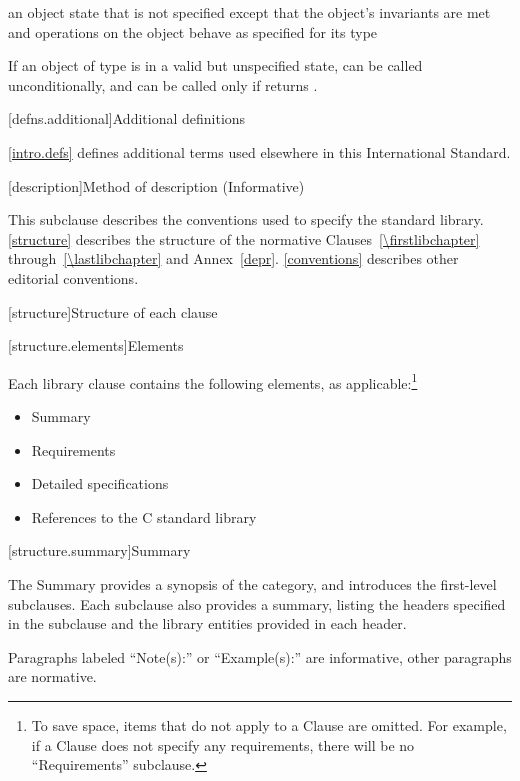 %
an object state that is not specified except that the object's invariants are
met and operations on the object behave as specified for its type\\
\begin{example} If an object  of type  is in a
valid but unspecified state,  can be called unconditionally,
and  can be called only if  returns
. \end{example}

[defns.additional]{Additional definitions}

\pnum
\ref{intro.defs} defines additional terms used elsewhere in this International Standard.

[description]{Method of description (Informative)}

\pnum
This subclause describes the conventions used to specify the \Cpp standard
library. \ref{structure} describes the structure of the normative
Clauses~\ref{\firstlibchapter} through~\ref{\lastlibchapter} and
Annex~\ref{depr}. \ref{conventions} describes other editorial conventions.

[structure]{Structure of each clause}

[structure.elements]{Elements}

\pnum
Each library clause contains the following elements, as applicable:\footnote{To
save space, items that do not apply to a Clause are omitted.
For example, if a Clause does not specify any requirements,
there will be no ``Requirements'' subclause.}

\begin{itemize}
\item Summary
\item Requirements
\item Detailed specifications
\item References to the C standard library
\end{itemize}

[structure.summary]{Summary}

\pnum
The Summary provides a synopsis of the category, and introduces the first-level subclauses.
Each subclause also provides a summary, listing the headers specified in the
subclause and the library entities provided in each header.

\pnum
Paragraphs labeled ``Note(s):'' or ``Example(s):'' are informative, other paragraphs
are normative.


